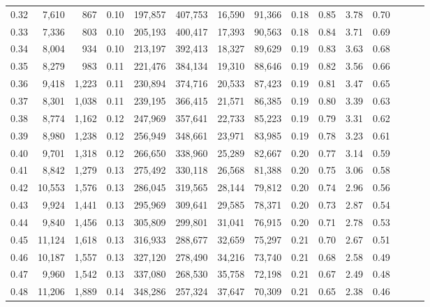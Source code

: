 \begin{tabular}{rrrrrrrrrrrrrrr}
0.32 &   7,610 &    867 &  0.10 &  197,857 &  407,753 &   16,590 &   91,366 &  0.18 &  0.85 &  3.78 &      0.70 \\
0.33 &   7,336 &    803 &  0.10 &  205,193 &  400,417 &   17,393 &   90,563 &  0.18 &  0.84 &  3.71 &      0.69 \\
0.34 &   8,004 &    934 &  0.10 &  213,197 &  392,413 &   18,327 &   89,629 &  0.19 &  0.83 &  3.63 &      0.68 \\
0.35 &   8,279 &    983 &  0.11 &  221,476 &  384,134 &   19,310 &   88,646 &  0.19 &  0.82 &  3.56 &      0.66 \\
0.36 &   9,418 &  1,223 &  0.11 &  230,894 &  374,716 &   20,533 &   87,423 &  0.19 &  0.81 &  3.47 &      0.65 \\
0.37 &   8,301 &  1,038 &  0.11 &  239,195 &  366,415 &   21,571 &   86,385 &  0.19 &  0.80 &  3.39 &      0.63 \\
0.38 &   8,774 &  1,162 &  0.12 &  247,969 &  357,641 &   22,733 &   85,223 &  0.19 &  0.79 &  3.31 &      0.62 \\
0.39 &   8,980 &  1,238 &  0.12 &  256,949 &  348,661 &   23,971 &   83,985 &  0.19 &  0.78 &  3.23 &      0.61 \\
0.40 &   9,701 &  1,318 &  0.12 &  266,650 &  338,960 &   25,289 &   82,667 &  0.20 &  0.77 &  3.14 &      0.59 \\
0.41 &   8,842 &  1,279 &  0.13 &  275,492 &  330,118 &   26,568 &   81,388 &  0.20 &  0.75 &  3.06 &      0.58 \\
0.42 &  10,553 &  1,576 &  0.13 &  286,045 &  319,565 &   28,144 &   79,812 &  0.20 &  0.74 &  2.96 &      0.56 \\
0.43 &   9,924 &  1,441 &  0.13 &  295,969 &  309,641 &   29,585 &   78,371 &  0.20 &  0.73 &  2.87 &      0.54 \\
0.44 &   9,840 &  1,456 &  0.13 &  305,809 &  299,801 &   31,041 &   76,915 &  0.20 &  0.71 &  2.78 &      0.53 \\
0.45 &  11,124 &  1,618 &  0.13 &  316,933 &  288,677 &   32,659 &   75,297 &  0.21 &  0.70 &  2.67 &      0.51 \\
0.46 &  10,187 &  1,557 &  0.13 &  327,120 &  278,490 &   34,216 &   73,740 &  0.21 &  0.68 &  2.58 &      0.49 \\
0.47 &   9,960 &  1,542 &  0.13 &  337,080 &  268,530 &   35,758 &   72,198 &  0.21 &  0.67 &  2.49 &      0.48 \\
0.48 &  11,206 &  1,889 &  0.14 &  348,286 &  257,324 &   37,647 &   70,309 &  0.21 &  0.65 &  2.38 &      0.46 \\

\end{tabular}
